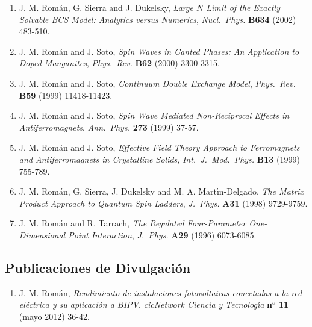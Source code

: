\documentclass{article}
\begin{document}
\begin{enumerate}
\item J. M. Rom\'an, G. Sierra and J. Dukelsky, 
{\it Large $N$ Limit of the Exactly Solvable BCS Model: 
Analytics versus Numerics},
{\it Nucl.~Phys.} {\bf B634} (2002) 483-510.

\item J. M. Rom\'an and J. Soto, 
{\it Spin Waves in Canted Phases: An Application to Doped Manganites}, 
{\it Phys.~Rev.} {\bf B62} (2000) 3300-3315.

\item J. M. Rom\'an and J. Soto, 
{\it Continuum Double Exchange Model},
{\it Phys.~Rev.} {\bf B59} (1999) 11418-11423.

\item J. M. Rom\'an and J. Soto, 
{\it Spin Wave Mediated Non-Reciprocal Effects in Antiferromagnets}, 
{\it Ann.~Phys.} {\bf 273} (1999) 37-57.

\item J. M. Rom\'an and J. Soto, 
{\it Effective Field Theory Approach to Ferromagnets and Antiferromagnets 
in Crystalline Solids}, 
{\it Int.~J.~Mod.~Phys.} {\bf B13} (1999) 755-789.

\item J. M. Rom\'an, G. Sierra, J. Dukelsky and M. A. Mart\'{\i}n-Delgado, 
{\it The Matrix Product Approach to Quantum Spin Ladders}, 
{\it J.~Phys.} {\bf A31} (1998) 9729-9759.

\item J. M. Rom\'an and R. Tarrach, 
{\it The Regulated Four-Parameter One-Dimensional Point Interaction}, 
{\it J.~Phys.} {\bf A29} (1996) 6073-6085.
\end{enumerate}


\subsection*{Publicaciones de Divulgaci\'on}

\begin{enumerate}
\item J. M. Rom\'an,
{\it Rendimiento de instalaciones fotovoltaicas conectadas a la red el\'ectrica y su aplicaci\'on a BIPV}.
{\it cicNetwork Ciencia y Tecnolog\'{\i}a} {\bf n$^o$ 11} (mayo 2012) 36-42.
\end{enumerate}
\end{document}

